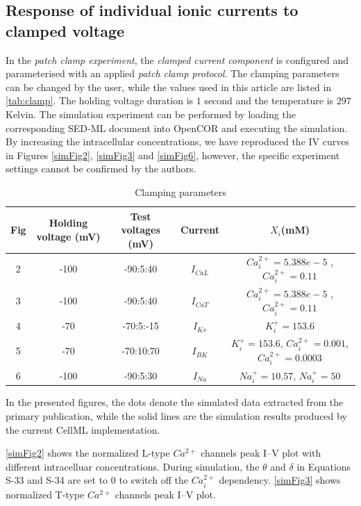 \documentclass[fleqn,10pt]{physiome}
\begin{document}
\subsection{Response of individual ionic currents to clamped voltage}
In the \emph{patch clamp experiment}, the \emph{clamped current component} is configured and parameterised with an applied \emph{patch clamp protocol}. The clamping parameters can be changed by the user, while the values used in this article are listed in \autoref{tab:clamp}. The holding voltage duration is $1$ second and the temperature is $297$ Kelvin. The simulation experiment can be performed by loading the corresponding SED-ML document into OpenCOR and executing the simulation. By increasing the intracellular concentrations, we have reproduced the IV curves in Figures \ref{simFig2}, \ref{simFig3} and \ref{simFig6}, however, the specific experiment settings cannot be confirmed by the authors.

\begin{table}[hbt!]\centering
\caption{Clamping parameters}\label{tab:clamp}
\resizebox{\textwidth}{!} {
\begin{tabular}{ccccc}
\toprule
Fig & Holding voltage (mV) & Test voltages (mV) &  Current& $X_i$(mM)\\
\midrule
2 & -100 & -90:5:40  & $I_{CaL}$ & $Ca_{i}^{2+}=5.388e-5$ ,$Ca_{i}^{2+}=0.11$ \\
3 & -100 & -90:5:40 & $I_{CaT}$ & $Ca_{i}^{2+}=5.388e-5$ ,$Ca_{i}^{2+}=0.11$ \\
4 & -70 & -70:5:-15 & $I_{Kv}$ & $K_{i}^{+}=153.6$ \\
5 & -70 & -70:10:70  & $I_{BK}$ & $K_{i}^{+}=153.6$, $Ca_{i}^{2+}=0.001$, $Ca_{i}^{2+}=0.0003$ \\
6 & -100 & -90:5:30  & $I_{Na}$ & $Na_{i}^{+}=10.57$, $Na_{i}^{+}=50$ \\
\bottomrule
\end{tabular}
}
\end{table}

In the presented figures, the dots denote the simulated data extracted from the primary publication, while the solid lines are the simulation results produced by the current CellML implementation.

\autoref{simFig2} shows the normalized L-type $Ca^{2+}$ channels peak I–V plot with different intracelluar concentrations. During simulation, the $\theta$ and $\delta$ in Equations S-33 and S-34 are set to 0 to switch off the $Ca_i^{2+}$ dependency. \autoref{simFig3} shows normalized T-type $Ca^{2+}$ channels peak I–V plot.
\end{document}
